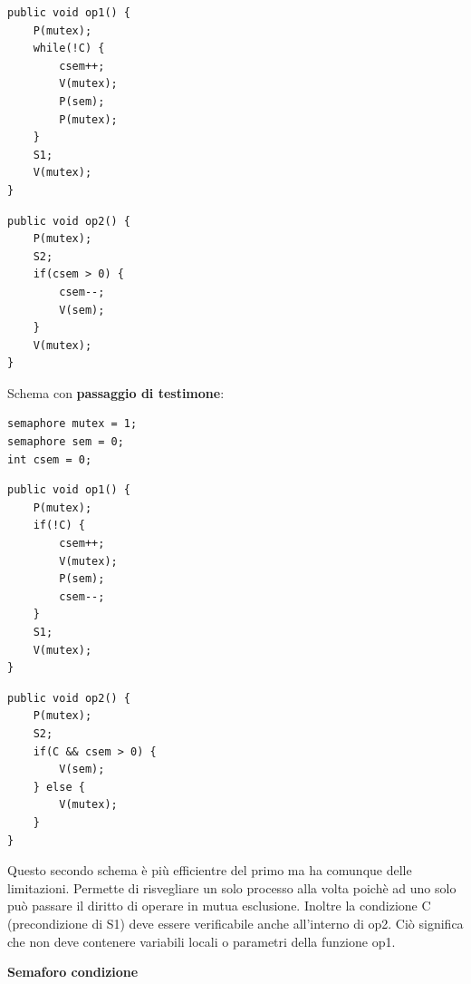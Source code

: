 \documentclass{article}
\begin{document}
\noindent\begin{minipage}{.45\columnwidth}
    \begin{lstlisting}
public void op1() {
    P(mutex);
    while(!C) {
        csem++;
        V(mutex);
        P(sem);
        P(mutex);
    }
    S1;
    V(mutex);
}
    \end{lstlisting}
\end{minipage}\hfill
\begin{minipage}{.45\columnwidth}
    \begin{lstlisting}
public void op2() {
    P(mutex);
    S2;
    if(csem > 0) {
        csem--;
        V(sem);
    }
    V(mutex);
}
    \end{lstlisting}
\end{minipage}

\vspace{3mm}
Schema con \textbf{passaggio di testimone}:

\begin{lstlisting}
semaphore mutex = 1;
semaphore sem = 0;
int csem = 0;
\end{lstlisting}

\noindent\begin{minipage}{.45\columnwidth}
    \begin{lstlisting}
public void op1() {
    P(mutex);
    if(!C) {
        csem++;
        V(mutex);
        P(sem);
        csem--;
    }
    S1;
    V(mutex);
}
    \end{lstlisting}
\end{minipage}\hfill
\begin{minipage}{.45\columnwidth}
    \begin{lstlisting}
public void op2() {
    P(mutex);
    S2;
    if(C && csem > 0) {
        V(sem);
    } else {
        V(mutex);
    }
}
    \end{lstlisting}
\end{minipage}

\vspace{3mm}
Questo secondo schema è più efficientre del primo ma ha comunque delle limitazioni. Permette di risvegliare un solo processo alla volta poichè ad uno solo può passare
il diritto di operare in mutua esclusione. Inoltre la condizione C (precondizione di S1) deve essere verificabile anche all'interno di op2. Ciò significa che
non deve contenere variabili locali o parametri della funzione op1.

\vspace{5mm}
\textbf{Semaforo condizione}
\end{document}
